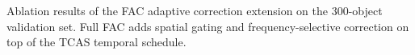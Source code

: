 \documentclass[times,twocolumn,final]{elsarticle}
\providecommand{\DIFdel}[1]{{\protect\color{red} \scriptsize #1}} %
\providecommand{\DIFdelbegin}{} %
\providecommand{\DIFdelFL}[1]{\DIFdel{#1}} %
\newcommand{\DIFscaledelfig}{0.5}
\newlength{\DIFdelgraphicswidth} %
\newlength{\DIFdelgraphicsheight} %
\newcommand{\DIFdelincludegraphics}[2][]{%
\sbox{\DIFdelgraphicsbox}{\DIFOincludegraphics[#1]{#2}}%
\settoboxwidth{\DIFdelgraphicswidth}{\DIFdelgraphicsbox} %
\settoboxtotalheight{\DIFdelgraphicsheight}{\DIFdelgraphicsbox} %
\scalebox{\DIFscaledelfig}{%
\parbox[b]{\DIFdelgraphicswidth}{\usebox{\DIFdelgraphicsbox}\\[-\baselineskip] \rule{\DIFdelgraphicswidth}{0em}}\llap{\resizebox{\DIFdelgraphicswidth}{\DIFdelgraphicsheight}{%
\setlength{\unitlength}{\DIFdelgraphicswidth}%
\begin{picture}(1,1)%
\thicklines\linethickness{2pt} %
{\color[rgb]{1,0,0}\put(0,0){\framebox(1,1){}}}%
{\color[rgb]{1,0,0}\put(0,0){\line( 1,1){1}}}%
{\color[rgb]{1,0,0}\put(0,1){\line(1,-1){1}}}%
\end{picture}%
}\hspace*{3pt}}} %
} %
\DeclareRobustCommand{\DIFdelbegin}{\DIFOdelbegin \let\includegraphics\DIFdelincludegraphics} %
\begin{document}
\DIFdelbegin %
{%
\DIFdelFL{Ablation results of the FAC adaptive correction extension on the 300-object validation set. Full FAC adds spatial gating and frequency-selective correction on top of the TCAS temporal schedule.}}
\end{document}
